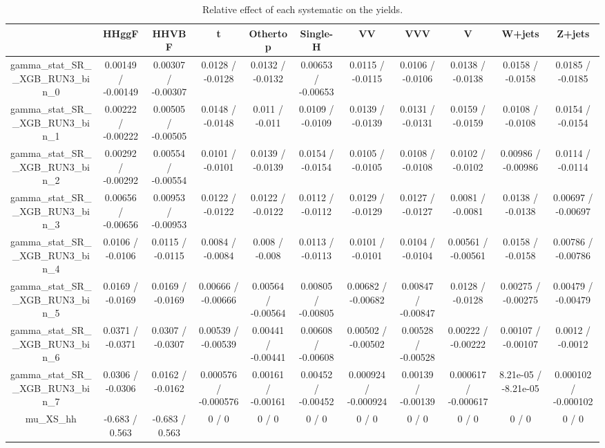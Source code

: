 \documentclass[10pt]{article}
\begin{document}
\begin{table}[htbp]
\begin{center}
\begin{tabular}{|c|c|c|c|c|c|c|c|c|c|c|}
\hline 
      & HHggF      & HHVBF      & t      & Othertop      & Single-H      & VV      & VVV      & V      & W+jets      & Z+jets \\ 
\hline 
  gamma_stat_SR__XGB_RUN3_bin_0 & 0.00149 / -0.00149 & 0.00307 / -0.00307 & 0.0128 / -0.0128 & 0.0132 / -0.0132 & 0.00653 / -0.00653 & 0.0115 / -0.0115 & 0.0106 / -0.0106 & 0.0138 / -0.0138 & 0.0158 / -0.0158 & 0.0185 / -0.0185 \\ 
  gamma_stat_SR__XGB_RUN3_bin_1 & 0.00222 / -0.00222 & 0.00505 / -0.00505 & 0.0148 / -0.0148 & 0.011 / -0.011 & 0.0109 / -0.0109 & 0.0139 / -0.0139 & 0.0131 / -0.0131 & 0.0159 / -0.0159 & 0.0108 / -0.0108 & 0.0154 / -0.0154 \\ 
  gamma_stat_SR__XGB_RUN3_bin_2 & 0.00292 / -0.00292 & 0.00554 / -0.00554 & 0.0101 / -0.0101 & 0.0139 / -0.0139 & 0.0154 / -0.0154 & 0.0105 / -0.0105 & 0.0108 / -0.0108 & 0.0102 / -0.0102 & 0.00986 / -0.00986 & 0.0114 / -0.0114 \\ 
  gamma_stat_SR__XGB_RUN3_bin_3 & 0.00656 / -0.00656 & 0.00953 / -0.00953 & 0.0122 / -0.0122 & 0.0122 / -0.0122 & 0.0112 / -0.0112 & 0.0129 / -0.0129 & 0.0127 / -0.0127 & 0.0081 / -0.0081 & 0.0138 / -0.0138 & 0.00697 / -0.00697 \\ 
  gamma_stat_SR__XGB_RUN3_bin_4 & 0.0106 / -0.0106 & 0.0115 / -0.0115 & 0.0084 / -0.0084 & 0.008 / -0.008 & 0.0113 / -0.0113 & 0.0101 / -0.0101 & 0.0104 / -0.0104 & 0.00561 / -0.00561 & 0.0158 / -0.0158 & 0.00786 / -0.00786 \\ 
  gamma_stat_SR__XGB_RUN3_bin_5 & 0.0169 / -0.0169 & 0.0169 / -0.0169 & 0.00666 / -0.00666 & 0.00564 / -0.00564 & 0.00805 / -0.00805 & 0.00682 / -0.00682 & 0.00847 / -0.00847 & 0.0128 / -0.0128 & 0.00275 / -0.00275 & 0.00479 / -0.00479 \\ 
  gamma_stat_SR__XGB_RUN3_bin_6 & 0.0371 / -0.0371 & 0.0307 / -0.0307 & 0.00539 / -0.00539 & 0.00441 / -0.00441 & 0.00608 / -0.00608 & 0.00502 / -0.00502 & 0.00528 / -0.00528 & 0.00222 / -0.00222 & 0.00107 / -0.00107 & 0.0012 / -0.0012 \\ 
  gamma_stat_SR__XGB_RUN3_bin_7 & 0.0306 / -0.0306 & 0.0162 / -0.0162 & 0.000576 / -0.000576 & 0.00161 / -0.00161 & 0.00452 / -0.00452 & 0.000924 / -0.000924 & 0.00139 / -0.00139 & 0.000617 / -0.000617 & 8.21e-05 / -8.21e-05 & 0.000102 / -0.000102 \\ 
  mu_XS_hh & -0.683 / 0.563 & -0.683 / 0.563 & 0 / 0 & 0 / 0 & 0 / 0 & 0 / 0 & 0 / 0 & 0 / 0 & 0 / 0 & 0 / 0 \\ 
\hline 
\end{tabular} 
\caption{Relative effect of each systematic on the yields.} 
\end{center} 
\end{table} 
\end{document}
